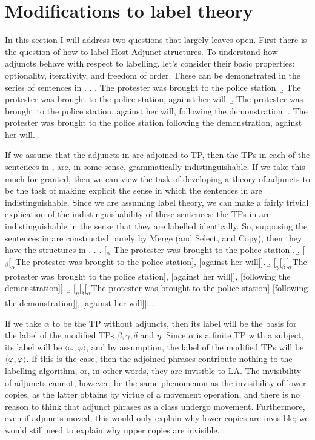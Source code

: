 \documentclass[MilwayThesis]{subfiles}
\begin{document}
\section{Modifications to label theory}\label{sec:modifications}

In this section I will address two questions that \textcite{chomsky2013problems,chomsky2015problems} largely leaves open.
First there is the question of how to label Host-Adjunct structures.
%
To understand how adjuncts behave with respect to labelling, let's consider their basic properties: optionality, iterativity, and freedom of order.
These can be demonstrated in the series of sentences in \Next.
\ex. 
\a. The protester was brought to the police station.
\b. The protester was brought to the police station, against her will.
\b. The protester was brought to the police station, against her will, following the demonstration.
\b. The protester was brought to the police station following the demonstration, against her will.
\z.

If we assume that the adjuncts in \Last are adjoined to TP, then the TPs in each of the sentences in \Last, are, in some sense, grammatically indistinguishable.
If we take this much for granted, then we can view the task of developing a theory of adjuncts to be the task of making explicit the sense in which the sentences in \Last are indistinguishable.
Since we are assuming label theory, we can make a fairly trivial explication of the indistinguishability of these sentences: the TPs in \Last are indistinguishable in the sense that they are labelled identically.
So, supposing the sentences in \Last are constructed purely by Merge (and Select, and Copy), then they have the structures in \Next.
\ex.
\a. [$_\alpha$ The protester was brought to the police station].
\b. [$_{\beta} [_{\alpha}$The protester was brought to the police station], [against her will]].
\b. $[_{\gamma}[_{\beta}[_{\alpha}$The protester was brought to the police station], [against her will]], [following the demonstration]].
\b. $[_{\eta} [_{\delta} [_{\alpha}$The protester was brought to the police station] [following the demonstration]], [against her will]].
\z.

If we take $\alpha$ to be the TP without adjuncts, then its label will be the basis for the label of the modified TPs $\beta, \gamma, \delta$ and $\eta$.
Since $\alpha$ is a finite TP with a subject, its label will be $\langle\varphi,\varphi\rangle$, and by assumption, the label of the modified TPs will be $\langle\varphi,\varphi\rangle$.
If this is the case, then the adjoined phrases contribute nothing to the labelling algorithm, or, in other words, they are invisible to LA.
The invisibility of adjuncts cannot, however, be the same phenomenon as the invisibility of lower copies, as the latter obtains by virtue of a movement operation, and there is no reason to think that adjunct phrases as a class undergo movement.
Furthermore, even if adjuncts moved, this would only explain why lower copies are invisible; we would still need to explain why upper copies are invisible.
\end{document}
